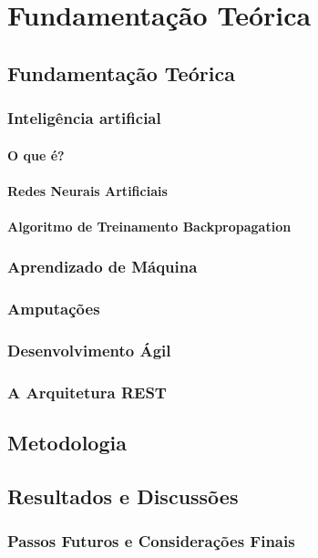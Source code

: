 \part{Fundamentação Teórica}
\chapter[Fundamentação Teórica]{Fundamentação Teórica}

\section{Inteligência artificial}
    \subsection{O que é?}
        
    \subsection{Redes Neurais Artificiais}
        
    \subsection{Algoritmo de Treinamento Backpropagation}
        

\section{Aprendizado de Máquina}
    

\section{Amputações}
    

\section{Desenvolvimento Ágil}
    

\section{A Arquitetura REST}
    
    
\chapter[Metodologia]{Metodologia}
    

\chapter{Resultados e Discussões}
    
    \section{Passos Futuros e Considerações Finais}
        

